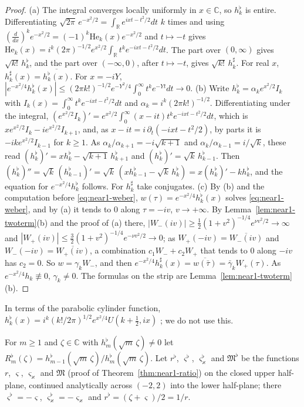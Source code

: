\documentclass[11pt]{amsart}
\theoremstyle{definition}
\theoremstyle{remark}
\numberwithin{equation}{section}
\newcommand{\C}{\mathbb{C}}
\newcommand{\R}{\mathbb{R}}
\newcommand{\He}{\mathrm{He}}
\begin{document}
\begin{proof}
(a) The integral converges locally uniformly in $x\in\C$, so $h_k^\flat$ is entire. Differentiating $\sqrt{2\pi}\,e^{-x^2/2}=\int_\R e^{ixt-t^2/2}dt$ $k$ times and using $(\frac d{dx})^ke^{-x^2/2}=(-1)^k\He_k(x)e^{-x^2/2}$ and $t\mapsto-t$ gives $\He_k(x)=i^k(2\pi)^{-1/2}e^{x^2/2}\int_\R t^ke^{-ixt-t^2/2}dt$. The part over $(0,\infty)$ gives $\sqrt{k!}\,h_k^\flat$, and the part over $(-\infty,0)$, after $t\mapsto-t$, gives $\sqrt{k!}\,h_k^\sharp$. For real $x$, $h_k^\sharp(x)=\overline{h_k^\flat(x)}$. For $x=-iY$, $|e^{-x^2/4}h_k^\flat(x)|\le(2\pi k!)^{-1/2}e^{-Y^2/4}\int_0^\infty t^ke^{-Yt}dt\to0$.
(b) Write $h_k^\flat=\alpha_ke^{x^2/2}I_k$ with $I_k(x)=\int_0^\infty t^ke^{-ixt-t^2/2}dt$ and $\alpha_k=i^k(2\pi k!)^{-1/2}$. Differentiating under the integral, $(e^{x^2/2}I_k)'=e^{x^2/2}\int_0^\infty(x-it)t^ke^{-ixt-t^2/2}dt$, which is $xe^{x^2/2}I_k-ie^{x^2/2}I_{k+1}$, and, as $x-it=i\,\partial_t(-ixt-t^2/2)$, by parts it is $-ike^{x^2/2}I_{k-1}$ for $k\ge1$. As $\alpha_k/\alpha_{k+1}=-i\sqrt{k+1}$ and $\alpha_k/\alpha_{k-1}=i/\sqrt k$, these read $(h_k^\flat)'=xh_k^\flat-\sqrt{k+1}\,h_{k+1}^\flat$ and $(h_k^\flat)'=\sqrt k\,h_{k-1}^\flat$. Then $(h_k^\flat)''=\sqrt k\,(h_{k-1}^\flat)'=\sqrt k\,(xh_{k-1}^\flat-\sqrt k\,h_k^\flat)=x(h_k^\flat)'-kh_k^\flat$, and the equation for $e^{-x^2/4}h_k^\flat$ follows. For $h_k^\sharp$ take conjugates.
(c) By (b) and the computation before \eqref{eq:near1-weber}, $w(\tau)=e^{-x^2/4}h_k^\flat(x)$ solves \eqref{eq:near1-weber}, and by (a) it tends to $0$ along $\tau=-iv$, $v\to+\infty$. By Lemma~\ref{lem:near1-twoterm}(b) and the proof of (a) there, $|W_-(iv)|\ge\frac12(1+v^2)^{-1/4}e^{\nu v^2/2}\to\infty$ and $|W_+(iv)|\le\frac32(1+v^2)^{-1/4}e^{-\nu v^2/2}\to0$; as $W_+(-iv)=\overline{W_-(iv)}$ and $W_-(-iv)=\overline{W_+(iv)}$, a combination $c_1W_-+c_2W_+$ that tends to $0$ along $-iv$ has $c_2=0$. So $w=\gamma_kW_-$, and then $e^{-x^2/4}h_k^\sharp(x)=\overline{w(\bar\tau)}=\bar\gamma_kW_+(\tau)$. As $e^{-x^2/4}h_k\not\equiv0$, $\gamma_k\ne0$. The formulas on the strip are Lemma~\ref{lem:near1-twoterm}(b).
\end{proof}

In terms of the parabolic cylinder function, $h_k^\flat(x)=i^k(k!/2\pi)^{1/2}e^{x^2/4}U(k+\frac12,ix)$ \cite[12.5.1]{DLMF}; we do not use this.

For $m\ge1$ and $\zeta\in\C$ with $h_m^\flat(\sqrt m\,\zeta)\ne0$ let $R_m^\flat(\zeta)=h_{m-1}^\flat(\sqrt m\,\zeta)/h_m^\flat(\sqrt m\,\zeta)$. Let $r^\flat$, $\varsigma^\flat$, $\varsigma_\varkappa^\flat$ and $\mathfrak M^\flat$ be the functions $r$, $\varsigma$, $\varsigma_\varkappa$ and $\mathfrak M$ (proof of Theorem~\ref{thm:near1-ratio}) on the closed upper half-plane, continued analytically across $(-2,2)$ into the lower half-plane; there $\varsigma^\flat=-\varsigma$, $\varsigma_\varkappa^\flat=-\varsigma_\varkappa$ and $r^\flat=(\zeta+\varsigma)/2=1/r$.
\end{document}
